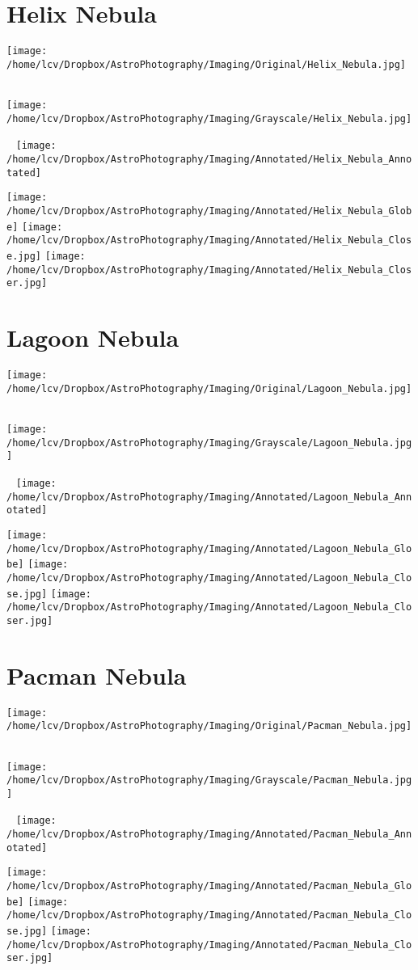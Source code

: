 \section{Helix Nebula}
\texttt{[image: /home/lcv/Dropbox/AstroPhotography/Imaging/Original/Helix\_Nebula.jpg]}
{\footnotesize\color{white}

}\ \\
\texttt{[image: /home/lcv/Dropbox/AstroPhotography/Imaging/Grayscale/Helix\_Nebula.jpg]}
\begin{center}
 \ \newpage
\texttt{[image: /home/lcv/Dropbox/AstroPhotography/Imaging/Annotated/Helix\_Nebula\_Annotated]}

\texttt{[image: /home/lcv/Dropbox/AstroPhotography/Imaging/Annotated/Helix\_Nebula\_Globe]}
\texttt{[image: /home/lcv/Dropbox/AstroPhotography/Imaging/Annotated/Helix\_Nebula\_Close.jpg]}
\texttt{[image: /home/lcv/Dropbox/AstroPhotography/Imaging/Annotated/Helix\_Nebula\_Closer.jpg]}
\end{center}
\section{Lagoon Nebula}
\texttt{[image: /home/lcv/Dropbox/AstroPhotography/Imaging/Original/Lagoon\_Nebula.jpg]}
{\footnotesize\color{white}

}\ \\
\texttt{[image: /home/lcv/Dropbox/AstroPhotography/Imaging/Grayscale/Lagoon\_Nebula.jpg]}
\begin{center}
 \ \newpage
\texttt{[image: /home/lcv/Dropbox/AstroPhotography/Imaging/Annotated/Lagoon\_Nebula\_Annotated]}

\texttt{[image: /home/lcv/Dropbox/AstroPhotography/Imaging/Annotated/Lagoon\_Nebula\_Globe]}
\texttt{[image: /home/lcv/Dropbox/AstroPhotography/Imaging/Annotated/Lagoon\_Nebula\_Close.jpg]}
\texttt{[image: /home/lcv/Dropbox/AstroPhotography/Imaging/Annotated/Lagoon\_Nebula\_Closer.jpg]}
\end{center}
\section{Pacman Nebula}
\texttt{[image: /home/lcv/Dropbox/AstroPhotography/Imaging/Original/Pacman\_Nebula.jpg]}
{\footnotesize\color{white}

}\ \\
\texttt{[image: /home/lcv/Dropbox/AstroPhotography/Imaging/Grayscale/Pacman\_Nebula.jpg]}
\begin{center}
 \ \newpage
\texttt{[image: /home/lcv/Dropbox/AstroPhotography/Imaging/Annotated/Pacman\_Nebula\_Annotated]}

\texttt{[image: /home/lcv/Dropbox/AstroPhotography/Imaging/Annotated/Pacman\_Nebula\_Globe]}
\texttt{[image: /home/lcv/Dropbox/AstroPhotography/Imaging/Annotated/Pacman\_Nebula\_Close.jpg]}
\texttt{[image: /home/lcv/Dropbox/AstroPhotography/Imaging/Annotated/Pacman\_Nebula\_Closer.jpg]}
\end{center}
